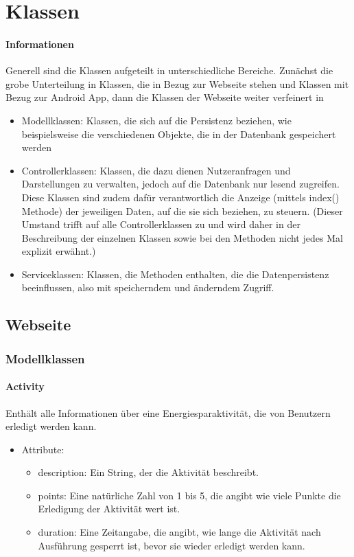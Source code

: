 \section{Klassen}
	\paragraph{Informationen}
	Generell sind die Klassen aufgeteilt in unterschiedliche Bereiche. Zun\"achst die grobe Unterteilung in Klassen, die in Bezug zur Webseite stehen und Klassen mit Bezug zur Android App, dann die Klassen der Webseite weiter verfeinert in
	\begin{itemize}
		\item Modellklassen: Klassen, die sich auf die Persistenz beziehen, wie beispielsweise die verschiedenen Objekte, die in der Datenbank gespeichert werden
		\item Controllerklassen: Klassen, die dazu dienen Nutzeranfragen und Darstellungen zu verwalten, jedoch auf die Datenbank nur lesend zugreifen. Diese Klassen sind zudem daf\"ur verantwortlich die Anzeige (mittels index() Methode) der jeweiligen Daten, auf die sie sich beziehen, zu steuern. (Dieser Umstand trifft auf alle Controllerklassen zu und wird daher in der Beschreibung der einzelnen Klassen sowie bei den Methoden nicht jedes Mal explizit erw\"ahnt.)
		\item Serviceklassen: Klassen, die Methoden enthalten, die die Datenpersistenz beeinflussen, also mit speicherndem und \"anderndem Zugriff. 
	\end{itemize}
	
\subsection{Webseite} %

\subsubsection{Modellklassen}
	\paragraph{Activity}Enth\"alt alle Informationen \"uber eine Energiesparaktivit\"at, die von Benutzern erledigt werden kann.
		\begin{itemize}
			\item Attribute:
				\begin{itemize}
					\item description: Ein String, der die Aktivit\"at beschreibt.
					\item points: Eine nat\"urliche Zahl von 1 bis 5, die angibt wie viele Punkte die Erledigung der Aktivit\"at wert ist.
					\item duration: Eine Zeitangabe, die angibt, wie lange die Aktivit\"at nach Ausf\"uhrung gesperrt ist, bevor sie wieder erledigt werden kann.
				\end{itemize}
		\end{itemize}
